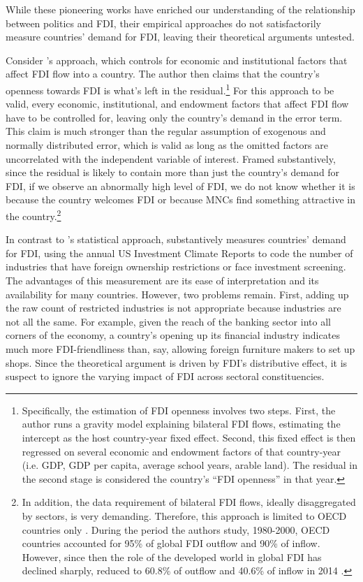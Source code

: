While these pioneering works have enriched our understanding of the relationship
between politics and FDI, their empirical approaches do not satisfactorily
measure countries' demand for FDI, leaving their theoretical arguments untested.

Consider \citet{Pinto2013}'s approach, which controls for economic and
institutional factors that affect FDI flow into a country. The author then
claims that the country's openness towards FDI is what's left in the
residual.\footnote{Specifically, the estimation of FDI openness involves two
steps. First, the author runs a gravity model explaining bilateral FDI flows,
estimating the intercept as the host country-year fixed effect. Second, this
fixed effect is then regressed on several economic and endowment factors of that
country-year (i.e. GDP, GDP per capita, average school years, arable land). The
residual in the second stage is considered the country's ``FDI openness'' in
that year.} For this approach to be valid, every economic, institutional, and
endowment factors that affect FDI flow have to be controlled for, leaving only
the country's demand in the error term. This claim is much stronger than the
regular assumption of exogenous and normally distributed error, which is valid
as long as the omitted factors are uncorrelated with the independent variable of
interest. Framed substantively, since the residual is likely to contain more
than just the country's demand for FDI, if we observe an abnormally high level
of FDI, we do not know whether it is because the country welcomes FDI or because
MNCs find something attractive in the country.\footnote{In addition, the data
requirement of bilateral FDI flows, ideally disaggregated by sectors, is very
demanding. Therefore, this approach is limited to OECD countries only
\citep{Pinto2008}. During the period the authors study, 1980-2000, OECD
countries accounted for 95\% of global FDI outflow and 90\% of inflow. However,
since then the role of the developed world in global FDI has declined sharply,
reduced to 60.8\% of outflow and 40.6\% of inflow in 2014 \citep{UNCTAD2015}.}

In contrast to \citet{Pinto2013}'s statistical approach, \citet{Pandya2014,
Pandya2016} substantively measures countries' demand for FDI, using the annual
US Investment Climate Reports to code the number of industries that have foreign
ownership restrictions or face investment screening. The advantages of this
measurement are its ease of interpretation and its availability for many
countries. However, two problems remain. First, adding up the raw count of
restricted industries is not appropriate because industries are not all the
same. For example, given the reach of the banking sector into all corners of the
economy, a country's opening up its financial industry indicates much more
FDI-friendliness than, say, allowing foreign furniture makers to set up shops.
Since the theoretical argument is driven by FDI's distributive effect, it is
suspect to ignore the varying impact of FDI across sectoral constituencies.

